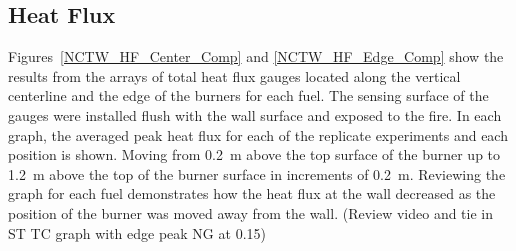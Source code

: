 \documentclass[twoside]{uocthesis}
\begin{document}
{\subsection{Heat Flux}

Figures~\ref{NCTW_HF_Center_Comp} and \ref{NCTW_HF_Edge_Comp} show the results from the arrays of total heat flux gauges located along the vertical centerline and the edge of the burners for each fuel.  The sensing surface of the gauges were installed flush with the wall surface and exposed to the fire. In each graph, the averaged peak heat flux for each of the replicate experiments and each position is shown.  Moving from 0.2~m above the top surface of the burner up to 1.2~m above the top of the burner surface in increments of 0.2~m.  Reviewing the graph for each fuel demonstrates how the heat flux at the wall decreased as the position of the burner was moved away from the wall.  (Review video and tie in ST TC graph with edge peak NG at 0.15)

}
\end{document}
